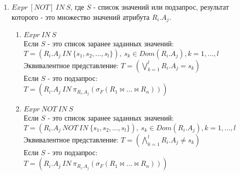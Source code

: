 \documentclass{cmi}
\def \n #1{\mathit{#1}}
\begin{document}
\begin{enumerate}
	
	\item \label{itm:IN_S} $\n{Expr}\ \n{[NOT]}\ \n{IN}\ S$, где $S$ - список значений или подзапрос,
	результат которого - это множество значений атрибута $R_i.A_j$.
	\begin{enumerate}
		\item $\n{Expr}\ \n{IN}\ S$\\
		Если $S$ - это список заранее заданных значений:\\
		$T = (\n{R_i.A_j}\ \n{IN}\ \{s_1, s_2, \dots, s_l \}),\ s_k \in Dom(R_i.A_j), k = 1, \dots, l$\\
		Эквивалентное представление: $T = (\bigvee\limits_{k=1}^{l} \n{R_i.A_j} = s_k)$\\
		Если $S$ - это подзапрос:\\
		$T = (\n{R_i.A_j}\ \n{IN}\ \pi_{R_i.A_j} (\sigma_F (R_1 \Join \dots \Join R_n)))$\\
		\item $\n{Expr}\ \n{NOT}\ \n{IN}\ S$\\
		Если $S$ - это список заранее заданных значений:\\
		$T = (\n{R_i.A_j}\ \n{NOT}\ \n{IN}\ \{s_1, s_2, \dots, s_l \}),\ s_k \in Dom(R_i.A_j), k = 1,
		\dots, l$\\
		Эквивалентное представление: $T = (\bigwedge\limits_{k=1}^{l} \n{R_i.A_j} \ne s_k)$\\
		Если $S$ - это подзапрос:\\
		$T = (\n{R_i.A_j}\ \n{IN}\ \pi_{R_i.A_j} (\sigma_F (R_1 \Join \dots \Join R_n)))$\\
	\end{enumerate}
	

\end{enumerate}
\end{document}
